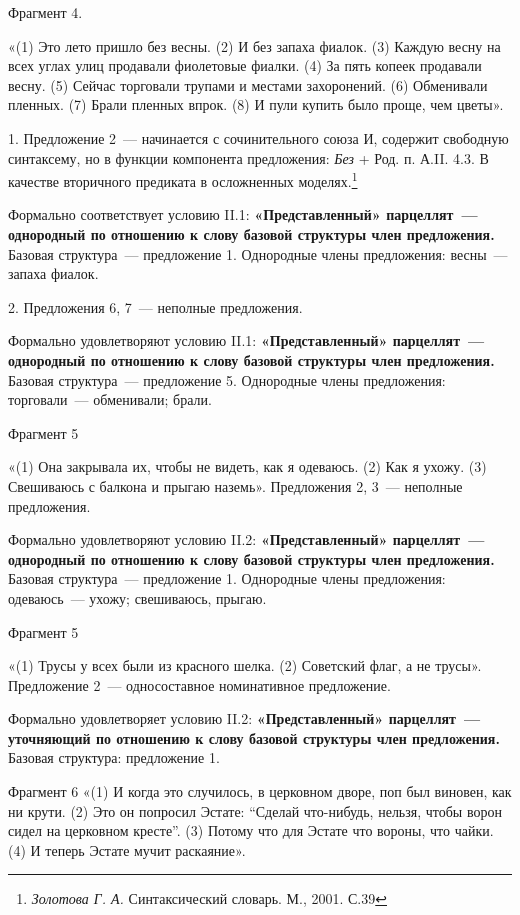 \documentclass{kursa4}
\begin{document}
      Фрагмент 4.

      «(1) Это лето пришло без весны. (2) И без запаха фиалок. (3) Каждую весну на всех углах улиц продавали фиолетовые фиалки. (4) За пять копеек продавали весну. (5) Сейчас торговали трупами и местами захоронений. (6) Обменивали пленных. (7) Брали пленных впрок. (8) И пули купить было проще, чем цветы».

      1. Предложение 2~--- начинается с сочинительного союза И, содержит свободную синтаксему, но в функции компонента предложения: \textit{Без }+ Род. п. А.II. 4.3. В качестве вторичного предиката в осложненных моделях.\footnote{\textit{Золотова Г. А.} Синтаксический словарь. М., 2001. С.39}

      Формально соответствует условию II.1: \textbf{«Представленный» парцеллят~--- однородный по отношению к слову базовой структуры член предложения.} Базовая структура~--- предложение 1. Однородные члены предложения: весны~--- запаха фиалок.

      {2. Предложения 6, 7~--- неполные предложения.}

      {Формально
      }{удовлетворяют}{
      }{условию II.1}{:
      }\textbf{{«Представленный» парцеллят~--- однородный по отношению к слову базовой структуры член предложения.
      }}{Базовая структура~--- предложение 5. Однородные члены предложения: торговали~--- обменивали; брали.}

      {Фрагмент 5}

      «(1) Она закрывала их, чтобы не видеть, как я одеваюсь. (2) Как я ухожу. (3) Свешиваюсь с балкона и прыгаю наземь». Предложения 2, 3~--- неполные предложения. 

      {Формально
      }{удовлетворяют}{
      }{условию }{II.2}{:
      }\textbf{{«Представленный» парцеллят~--- однородный по отношению к слову базовой структуры член предложения.
      }}{Базовая структура~--- предложение
      }{1}{. Однородные члены предложения: }{одеваюсь~--- ухожу; свешиваюсь, прыгаю.}

      {Фрагмент 5}

     «(1) Трусы у всех были из красного шелка. (2) Советский флаг, а не трусы». Предложение 2~--- односоставное номинативное предложение. 

     Формально удовлетворяет условию II.2: \textbf{«Представленный» парцеллят~--- уточняющий по отношению к слову базовой структуры член предложения. }Базовая структура: предложение 1. 

     Фрагмент 6 «(1) И когда это случилось, в церковном дворе, поп был виновен, как ни крути. (2) Это он попросил Эстате: “Сделай что-нибудь, нельзя, чтобы ворон сидел на церковном кресте”. (3) Потому что для Эстате что вороны, что чайки. (4) И теперь Эстате мучит раскаяние». 
\end{document}
